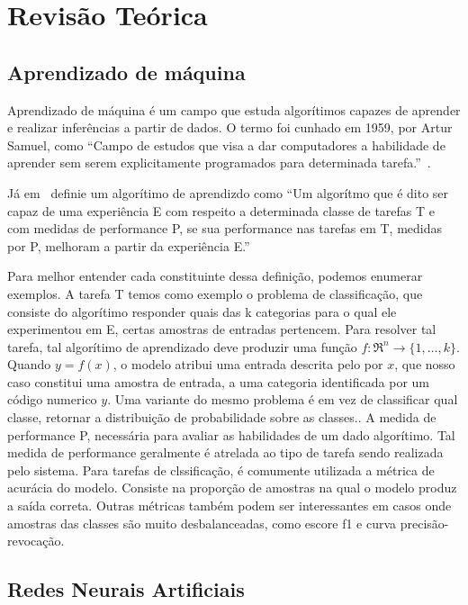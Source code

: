 \section{Revisão Teórica}\label{sec:Cap2_revisao_teorica}

\subsection{Aprendizado de máquina}\label{sec:aprendizado_maquina}

Aprendizado de máquina é um campo que estuda algorítimos capazes de aprender e realizar inferências a partir de dados. O termo foi cunhado em 1959, por Artur Samuel, como “Campo de estudos que visa a dar computadores a habilidade de aprender sem serem explicitamente programados para determinada tarefa.”~\cite{Samuel1959SomeSI}.

Já em~\cite{Mitchell97} definie um algorítimo de aprendizdo como “Um algorítmo que é dito ser capaz de uma experiência E com respeito a determinada classe de tarefas T e com medidas de performance P, se sua performance nas tarefas em T, medidas por P, melhoram a partir da experiência E.”

Para melhor entender cada constituinte dessa definição, podemos enumerar exemplos. A
tarefa T temos como exemplo o problema de classificação, que consiste do algorítimo
responder quais das k categorias para o qual ele experimentou em E, certas amostras de entradas pertencem. Para resolver tal tarefa, tal algorítimo de aprendizado deve produzir uma função $f:\Re^n\rightarrow \{1,\ldots,k\}$. Quando $y=f(x)$, o modelo atribui uma entrada descrita pelo por $x$, que nosso caso constitui uma amostra de entrada, a uma categoria identificada por um código numerico $y$. Uma variante do mesmo problema é em vez de classificar qual classe, retornar a distribuição de probabilidade sobre as classes.\cite{GoodBengCour16}. A medida de performance P, necessária para avaliar as habilidades de um dado algorítimo. Tal medida de performance geralmente é atrelada ao tipo de tarefa sendo realizada pelo sistema. Para tarefas de clssificação, é comumente utilizada a métrica de acurácia do modelo. Consiste na proporção de amostras na qual o modelo produz a saída correta. Outras métricas também podem ser interessantes em casos onde amostras das classes são muito desbalanceadas, como escore f1 e curva precisão-revocação.


\subsection{Redes Neurais Artificiais}\label{sec:Cap2_redes_neurais}


